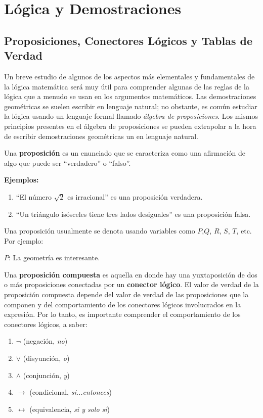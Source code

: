 \clearpage
\section{Lógica y Demostraciones}

\subsection{Proposiciones, Conectores Lógicos y Tablas de Verdad}

Un breve estudio de algunos de los aspectos más elementales y fundamentales de la lógica matemática será muy útil para comprender  algunas de las reglas de la lógica que a menudo se usan en los argumentos matemáticos. Las demostraciones geométricas se suelen escribir en lenguaje natural; no obstante, es común estudiar la lógica usando un lenguaje formal llamado \textit{álgebra de proposiciones}. Los mismos principios presentes en el álgebra de proposiciones se pueden extrapolar a la hora de escribir demostraciones geométricas un en lenguaje natural.

Una \textbf{proposición} es un enunciado que se caracteriza como una afirmación de algo que puede ser ``verdadero'' o ``falso''.

\textbf{Ejemplos:}

\begin{enumerate}
    \item ``El número $\sqrt{2}$ es irracional'' es una proposición verdadera.
    \item ``Un triángulo isósceles tiene tres lados desiguales'' es una proposición falsa.
\end{enumerate}

Una proposición usualmente se denota usando variables como $P$,$Q$, $R$, $S$, $T$, etc. Por ejemplo:

$P$: La geometría es interesante.

Una \textbf{proposición compuesta} es aquella en donde hay una yuxtaposición de dos o más proposiciones conectadas por un \textbf{conector lógico}. El valor de verdad de la proposición compuesta depende del valor de verdad de las proposiciones que la componen y del comportamiento de los conectores lógicos involucrados en la expresión. Por lo tanto, es importante comprender el comportamiento de los conectores lógicos, a saber: 

\begin{enumerate}
    \item $\neg$ (negación, \textit{no})
    \item $\vee$ (disyunción, \textit{o})
    \item $\wedge$ (conjunción, \textit{y})
    \item $\rightarrow$ (condicional, \textit{si...entonces})
    \item $\leftrightarrow$ (equivalencia, \textit{si y solo si})
\end{enumerate}

